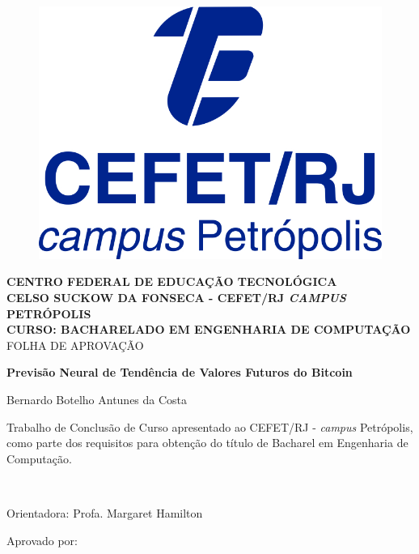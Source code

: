 {\center %


\begin{figure}
\center
\includegraphics[height=0.13\textwidth]{Figs/logoCefetCampusPetropolis.jpg} 
\end{figure}

\begin{center}
{\large \bf CENTRO FEDERAL DE EDUCAÇÃO TECNOLÓGICA} \vspace{1mm} \\
{\large \bf CELSO SUCKOW DA FONSECA - CEFET/RJ \textit{CAMPUS} PETRÓPOLIS} \vspace{1mm} \\
{\large \bf CURSO: BACHARELADO EM ENGENHARIA DE COMPUTAÇÃO}\\
\vspace*{1.2cm}
{\large  FOLHA DE APROVAÇÃO}

\vspace*{1.3cm}
{\large \bf  Previsão Neural de Tendência de Valores Futuros do Bitcoin}\\
\end{center}
\vspace{0.5cm}
\hfill
\begin{flushright}
    Bernardo Botelho Antunes da Costa
	\end{flushright}
\vspace*{0.5cm}
\begin{flushright}
	\begin{minipage}{0.5\textwidth}
		{\normalsize
		Trabalho de Conclusão de Curso apresentado ao  
	 CEFET/RJ -{ {\it campus} Petrópolis}, como parte dos requisitos para obtenção do título de Bacharel em Engenharia de Computação.}
	\end{minipage}\\[0.5cm]
\end{flushright}
\vspace{0.5cm}
\hfill
\begin{flushright}
Orientadora: Profa. Margaret Hamilton
\end{flushright}

\begin{minipage}{0.9\textwidth}
	\begin{flushleft}
	Aprovado por:
	\end{flushleft}
\end{minipage}\\[1cm]

}
